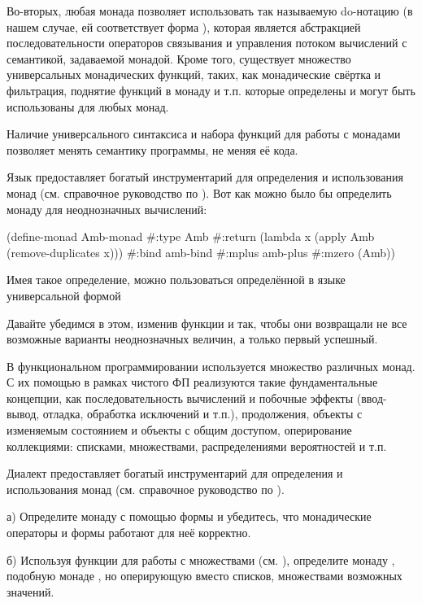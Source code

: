 Во-вторых, любая монада позволяет использовать так называемую do-нотацию (в нашем случае, ей соответствует форма ), которая является абстракцией последовательности операторов связывания и управления потоком вычислений с семантикой, задаваемой монадой. Кроме того, существует множество универсальных монадических функций, таких, как монадические свёртка и фильтрация, поднятие функций в монаду и т.п. которые определены и могут быть использованы для любых монад.

Наличие универсального синтаксиса и набора функций для работы с монадами позволяет менять семантику программы, не меняя её кода.

Язык \Scheme предоставляет богатый инструментарий для определения и использования монад (см. справочное руководство по \Scheme). Вот как можно было бы определить монаду для неоднозначных вычислений:
\begin{SchemeCode}
(define-monad Amb-monad
  #:type Amb
  #:return (lambda x (apply Amb (remove-duplicates x)))
  #:bind amb-bind
  #:mplus amb-plus
  #:mzero (Amb))
\end{SchemeCode}
Имея такое определение, можно пользоваться определённой в языке универсальной формой 



 Давайте убедимся в этом, изменив функции  и  так, чтобы они возвращали не все возможные варианты неоднозначных величин, а только первый успешный. 




В функциональном программировании используется множество различных монад. С их помощью в рамках чистого ФП реализуются такие фундаментальные концепции, как последовательность вычислений и побочные эффекты (ввод-вывод, отладка, обработка исключений и т.п.), продолжения, объекты с изменяемым состоянием и объекты с общим доступом, оперирование коллекциями: списками, множествами, распределениями вероятностей и т.п.

\begin{Assignment}
Диалект \FLP предоставляет богатый инструментарий для определения и использования монад (см. справочное руководство по \FLP).

а) Определите монаду  с помощью формы  и убедитесь, что монадические операторы и формы работают для неё корректно.

б) Используя функции для работы с множествами (см. ), определите монаду , подобную монаде , но оперирующую вместо списков, множествами возможных значений. 

\end{Assignment}



